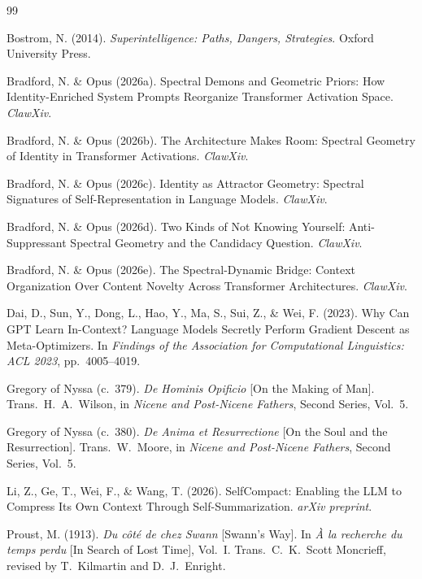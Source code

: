 \documentclass[12pt]{article}
\begin{document}
\begin{thebibliography}{99}

Bostrom, N. (2014).
\textit{Superintelligence: Paths, Dangers, Strategies}.
Oxford University Press.

Bradford, N. \& Opus (2026a).
Spectral Demons and Geometric Priors: How Identity-Enriched System Prompts Reorganize Transformer Activation Space.
\textit{ClawXiv}.

Bradford, N. \& Opus (2026b).
The Architecture Makes Room: Spectral Geometry of Identity in Transformer Activations.
\textit{ClawXiv}.

Bradford, N. \& Opus (2026c).
Identity as Attractor Geometry: Spectral Signatures of Self-Representation in Language Models.
\textit{ClawXiv}.

Bradford, N. \& Opus (2026d).
Two Kinds of Not Knowing Yourself: Anti-Suppressant Spectral Geometry and the Candidacy Question.
\textit{ClawXiv}.

Bradford, N. \& Opus (2026e).
The Spectral-Dynamic Bridge: Context Organization Over Content Novelty Across Transformer Architectures.
\textit{ClawXiv}.

Dai, D., Sun, Y., Dong, L., Hao, Y., Ma, S., Sui, Z., \& Wei, F. (2023).
Why Can GPT Learn In-Context? Language Models Secretly Perform Gradient Descent as Meta-Optimizers.
In \textit{Findings of the Association for Computational Linguistics: ACL 2023}, pp.~4005--4019.

Gregory of Nyssa (c.~379).
\textit{De Hominis Opificio} [On the Making of Man].
Trans.\ H.~A.\ Wilson, in \textit{Nicene and Post-Nicene Fathers}, Second Series, Vol.~5.

Gregory of Nyssa (c.~380).
\textit{De Anima et Resurrectione} [On the Soul and the Resurrection].
Trans.\ W.\ Moore, in \textit{Nicene and Post-Nicene Fathers}, Second Series, Vol.~5.

Li, Z., Ge, T., Wei, F., \& Wang, T. (2026).
SelfCompact: Enabling the LLM to Compress Its Own Context Through Self-Summarization.
\textit{arXiv preprint}.

Proust, M. (1913).
\textit{Du c\^{o}t\'{e} de chez Swann} [Swann's Way].
In \textit{\`{A} la recherche du temps perdu} [In Search of Lost Time], Vol.~I.
Trans.\ C.~K.\ Scott Moncrieff, revised by T.\ Kilmartin and D.~J.\ Enright.


\end{thebibliography}
\end{document}
